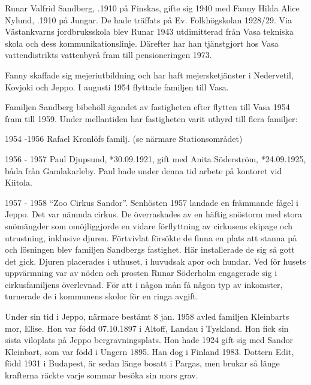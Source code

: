 Runar Valfrid Sandberg, .1910 på Finskas, gifte sig 1940 med Fanny Hilda Alice Nylund, .1910 på Jungar. De hade träffats på Ev. Folkhögskolan 1928/29. Via Västankvarns jordbruksskola blev Runar 1943 utdimitterad från Vasa tekniska skola och dess kommunikationslinje. Därefter har han tjänstgjort hos Vasa vattendistrikts vattenbyrå fram till pensioneringen 1973.

Fanny skaffade sig mejeriutbildning och har haft mejersketjänster i Nedervetil, Kovjoki och Jeppo. I augusti 1954 flyttade familjen till Vasa.
\begin{jhchildren}
  \item {}
  \item {}
\end{jhchildren}

Familjen Sandberg bibehöll ägandet av fastigheten efter flytten till Vasa 1954 fram till 1959. Under mellantiden har fastigheten varit uthyrd till flera familjer:

1954 -1956   Rafael Kronlöfs familj. (se närmare Stationsområdet)

1956 - 1957  Paul Djupsund, *30.09.1921, gift med Anita Söderström, *24.09.1925, båda från Gamlakarleby. Paul hade under denna tid arbete på kontoret vid Kiitola.
\begin{jhchildren}
  \item {}
  \item {}
  \item {}
\end{jhchildren}

1957 - 1958  ``Zoo Cirkus Sandor''. Senhösten 1957 landade en främmande fågel i Jeppo. Det var nämnda cirkus. De överraskades av en häftig snöstorm med stora snömängder som omöjliggjorde en vidare förflyttning av cirkusens ekipage och utrustning, inklusive djuren. Förtvivlat försökte de finna en plats att stanna på och lösningen blev familjen Sandbergs fastighet. Här installerade de sig så gott det gick. Djuren placerades i uthuset, i huvudsak apor och hundar. Ved för husets uppvärmning var av nöden och prosten Runar Söderholm engagerade sig i cirkusfamiljens överlevnad. För att i någon mån få någon typ av inkomster, turnerade de i kommunens skolor för en ringa avgift.

Under sin tid i Jeppo, närmare bestämt 8 jan. 1958 avled familjen Kleinbarts mor, Elise. Hon var född 07.10.1897 i Altoff, Landau i Tyskland. Hon fick sin sista viloplats på Jeppo bergravningsplats. Hon hade 1924 gift sig med Sandor Kleinbart, som var född i Ungern 1895. Han dog i Finland 1983. Dottern Edit, född 1931 i Budapest, är sedan länge bosatt i Pargas, men brukar så länge krafterna räckte varje sommar besöka sin mors grav.

